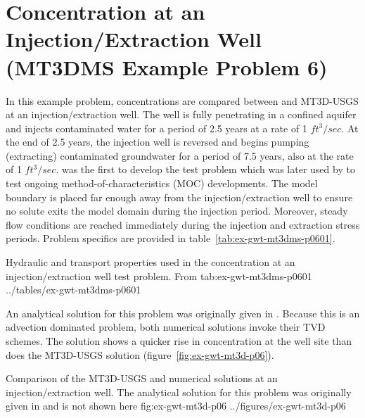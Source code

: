 \section{Concentration at an Injection/Extraction Well (MT3DMS Example Problem 6)}

In this example problem, concentrations are compared between \mf and MT3D-USGS at an injection/extraction well. The well is fully penetrating in a confined aquifer and injects contaminated water for a period of 2.5 years at a rate of 1 $ft^3/sec$.  At the end of 2.5 years, the injection well is reversed and begins pumping (extracting) contaminated groundwater for a period of 7.5 years, also at the rate of 1 $ft^3/sec$.  \cite{elkadi1988} was the first to develop the test problem which was later used by \cite{zheng1993} to test ongoing method-of-characteristics (MOC) developments.  The model boundary is placed far enough away from the injection/extraction well to ensure no solute exits the model domain during the injection period.  Moreover, steady flow conditions are reached immediately during the injection and extraction stress periods.  Problem specifics are provided in table~\ref{tab:ex-gwt-mt3dms-p0601}.

\begin{StandardTable}
	{Hydraulic and transport properties used in the concentration at an injection/extraction well test problem.  From \cite{zheng1999mt3dms}}
	{tab:ex-gwt-mt3dms-p0601}
	{../tables/ex-gwt-mt3dms-p0601}
\end{StandardTable}

An analytical solution for this problem was originally given in \cite{gelhar1971}.  Because this is an advection dominated problem, both numerical solutions invoke their TVD schemes.  The \mf solution shows a quicker rise in concentration at the well site than does the MT3D-USGS solution (figure~\ref{fig:ex-gwt-mt3d-p06}). 

\begin{StandardFigure}
	{Comparison of the MT3D-USGS and \mf numerical solutions at an injection/extraction well. The analytical solution for this problem was originally given in \citep{gelhar1971} and is not shown here} 
	{fig:ex-gwt-mt3d-p06}
	{../figures/ex-gwt-mt3d-p06}
\end{StandardFigure}


